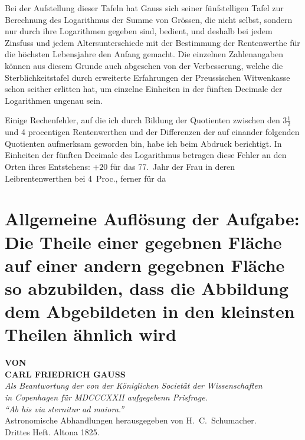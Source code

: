\documentclass[12pt,a4paper]{article}
\begin{document}
Bei der Aufstellung dieser Tafeln hat Gauss sich seiner fünfstelligen Tafel zur Berechnung des Logarithmus der Summe von Grössen, die nicht selbst, sondern nur durch ihre Logarithmen gegeben sind, bedient, und deshalb bei jedem Zinsfuss und jedem Altersunterschiede mit der Bestimmung der Rentenwerthe für die höchsten Lebensjahre den Anfang gemacht. Die einzelnen Zahlenangaben können aus diesem Grunde auch abgesehen von der Verbesserung, welche die Sterblichkeitstafel durch erweiterte Erfahrungen der Preussischen Witwenkasse schon seither erlitten hat, um einzelne Einheiten in der fünften Decimale der Logarithmen ungenau sein.

Einige Rechenfehler, auf die ich durch Bildung der Quotienten zwischen den $3\frac{1}{2}$ und 4 procentigen Rentenwerthen und der Differenzen der auf einander folgenden Quotienten aufmerksam geworden bin, habe ich beim Abdruck berichtigt. In Einheiten der fünften Decimale des Logarithmus betragen diese Fehler an den Orten ihres Entstehens: $+20$ für das 77.~Jahr der Frau in deren Leibrentenwerthen bei 4~Proc., ferner für da

\newpage
\section*{Allgemeine Auflösung der Aufgabe: Die Theile einer gegebnen Fläche auf einer andern gegebnen Fläche so abzubilden, dass die Abbildung dem Abgebildeten in den kleinsten Theilen ähnlich wird}

\begin{center}
\textbf{VON}\\[6pt]
\textbf{CARL FRIEDRICH GAUSS}\\[12pt]
\textit{Als Beantwortung der von der Königlichen Societät der Wissenschaften\\in Copenhagen für MDCCCXXII aufgegebenn Prisfrage.}\\[18pt]
\textit{``Ab his via sternitur ad maiora.''}\\[18pt]
Astronomische Abhandlungen herausgegeben von H.~C.~Schumacher.\\
Drittes Heft. Altona 1825.
\end{center}
\end{document}
